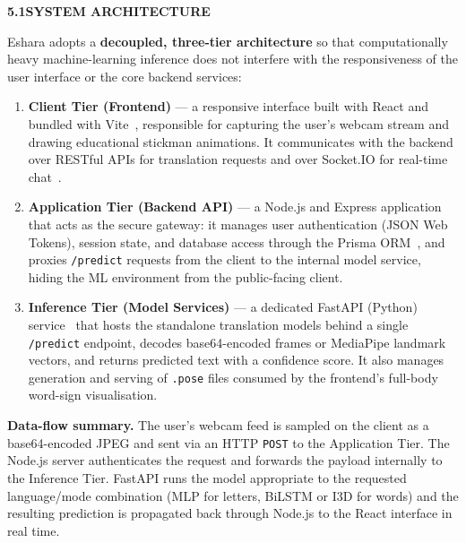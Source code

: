 \noindent\textbf{5.1\quad SYSTEM ARCHITECTURE}\par
{}
\vspace{0.2cm}

\noindent Eshara adopts a \textbf{decoupled, three-tier architecture} so that computationally heavy machine-learning inference does not interfere with the responsiveness of the user interface or the core backend services:
\begin{enumerate}
\item \textbf{Client Tier (Frontend)} --- a responsive interface built with React and bundled with Vite~\cite{react,vite2024}, responsible for capturing the user's webcam stream and drawing educational stickman animations. It communicates with the backend over RESTful APIs for translation requests and over Socket.IO for real-time chat~\cite{socketio2024}.
\item \textbf{Application Tier (Backend API)} --- a Node.js and Express application~\cite{nodejs2024,expressjs2024} that acts as the secure gateway: it manages user authentication (JSON Web Tokens), session state, and database access through the Prisma ORM~\cite{prisma2024,rfc7519}, and proxies \texttt{/predict} requests from the client to the internal model service, hiding the ML environment from the public-facing client.
\item \textbf{Inference Tier (Model Services)} --- a dedicated FastAPI (Python) service~\cite{fastapi,uvicorn2024} that hosts the standalone translation models behind a single \texttt{/predict} endpoint, decodes base64-encoded frames or MediaPipe landmark vectors, and returns predicted text with a confidence score. It also manages generation and serving of \texttt{.pose} files consumed by the frontend's full-body word-sign visualisation.
\end{enumerate}
\vspace{0.2cm}

\noindent \textbf{Data-flow summary.} The user's webcam feed is sampled on the client as a base64-encoded JPEG and sent via an HTTP \texttt{POST} to the Application Tier. The Node.js server authenticates the request and forwards the payload internally to the Inference Tier. FastAPI runs the model appropriate to the requested language/mode combination (MLP for letters, BiLSTM or I3D for words) and the resulting prediction is propagated back through Node.js to the React interface in real time.\par\vspace{0.2cm}

